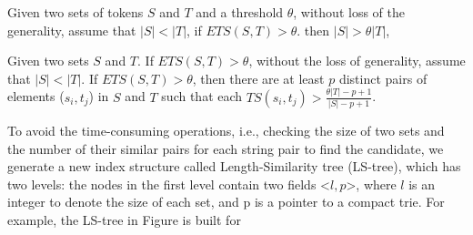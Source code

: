 \begin{lem}  Given two sets of tokens $S$ and $T$ and a threshold $\theta$, without loss of the generality, assume that $|S| < |T|$,  if $ETS(S,T) > \theta$. then $|S|> \theta |T|$,

\end{lem}

\smallskip

\begin{lem}  Given two sets $S$ and $T$. If $ETS(S,T) > \theta$, without the loss of generality, assume that $|S|<|T|$. If $ETS(S,T) > \theta$,  then there are at least $p$ distinct pairs of elements ($s_i, t_j$) in  $S$ and $T$ such that each $TS(s_i, t_j) > \frac{\theta |T| - p +1}{|S|-p+1} $. \label{lem:pthreshold}
\end{lem}

\smallskip

To avoid the time-consuming operations, i.e., checking the size of two sets and the number of their similar pairs for each string pair to find the candidate, we generate a new index structure called Length-Similarity tree (LS-tree), which has two levels: the nodes  in the first level contain two fields <$l,p$>, where $l$ is an integer to denote the size of each set, and p is a pointer to a compact trie. For example, the LS-tree in Figure is built for

